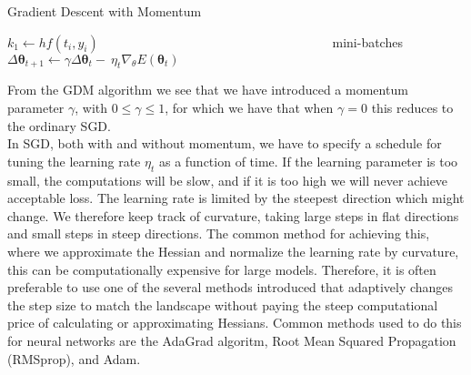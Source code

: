 \documentclass[english,notitlepage,reprint,nofootinbib]{revtex4-2}  %
\begin{document}
\begin{algorithm}[H]
    \caption{Gradient Descent with Momentum}\label{algo:GDM}
    \begin{algorithmic}
        \State $k_1 \leftarrow hf(t_i,y_i)$  
         
        \State $\:\:\:\:\:\:\:\:\:\:\:\:\:\:\:\:\:\:\:\:\:\:\:\:\:\:\:\:\:\:\:\:\:\:\:\:\:\:\:\:\:\:\:\:\:\:\:\:\:\:\:\:\:\:\:\:\:\:\:\:\:\:\:\:\:\:\:\:\:\:\:\:\:\:\:\:\:\:\:\:$ mini-batches
        \State $\Delta \boldsymbol{\theta}_{t+1} \leftarrow 
                \gamma \Delta \boldsymbol{\theta}_t -\ \eta_{t}\nabla_\theta E(\boldsymbol{\theta}_t)$ 
        \EndWhile
    \end{algorithmic}
\end{algorithm}
From the GDM algorithm we see that we have introduced a momentum parameter $\gamma$, with $0\leq\gamma\leq 1$, for which we have that when $\gamma = 0$ this reduces to the ordinary SGD. 
\vspace{3mm}
\\ 
In SGD, both with and without momentum, we have to specify a schedule for tuning the learning rate $\eta_t$ as a function of time. 
If the learning parameter is too small, the computations will be slow, and if it is too high we will never achieve acceptable loss. 
The learning rate is limited by the steepest direction which might change. We therefore keep track of curvature, taking large steps in flat directions and small steps in steep directions. 
The common method for achieving this, where we approximate the Hessian and normalize the learning rate by curvature, this can be computationally expensive for large models. Therefore, it is often preferable to use one of the several methods introduced that adaptively changes the step size to match the landscape without paying the steep computational price of calculating or approximating Hessians. Common methods used to do this for neural networks are the AdaGrad algoritm, Root Mean Squared Propagation (RMSprop), and Adam. 
\end{document}
